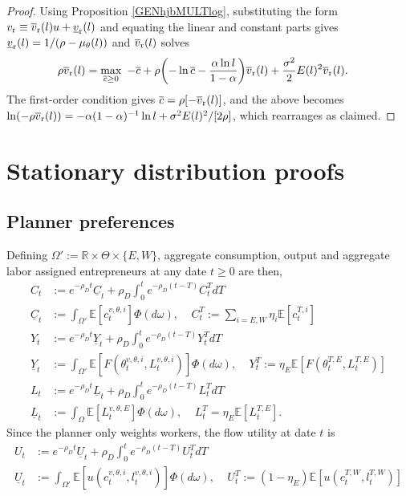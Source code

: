 \documentclass[11pt]{article}
\theoremstyle{plain}
\begin{document}
\begin{proof}
Using Proposition \ref{GENhjbMULTlog}, substituting the form $v_{\textnormal{r}} \equiv \overline{v}_{\textnormal{r}}(l)u + \underline{v}_{\textnormal{r}}(l)$ and equating the linear and constant parts gives $\underline{v}_{\textnormal{r}}(l) = 1/(\rho - \mu_{\theta}(l))$ and $\overline{v}_{\textnormal{r}}(l)$ solves
\begin{align*}
\rho \overline{v}_{\textnormal{r}}(l) & = \max_{\substack{\overline{c} \geq 0}} \ - \overline{c} + \rho {\left(-\ln \overline{c} - \frac{\alpha \ln l}{1-\alpha}\right)}\overline{v}_{\textnormal{r}}(l) + \frac{\sigma^2}{2}E(l)^2\overline{v}_{\textnormal{r}}(l).
\end{align*}
The first-order condition gives $\overline{c} = \rho[-\overline{v}_{\textnormal{r}}(l)]$, and the above becomes $\ln (-\rho\overline{v}_{\textnormal{r}}(l)) = - \alpha(1-\alpha)^{-1} \ln l + \sigma^2E(l)^2/[2\rho]$, which rearranges as claimed.
\end{proof}


\section{Stationary distribution proofs} \label{distproofs}
\subsection{Planner preferences} \label{planPREFapp}

Defining $\Omega' := \mathbb{R} \times \Theta \times \{E,W\}$, aggregate consumption, output and aggregate labor assigned  entrepreneurs at any date $t\geq0$ are then,
\begin{align*}
C_t & := e^{-\rho_Dt}\underline{C}_t + \rho_D\int_{0}^{t}e^{-\rho_D (t-T)} C^T_tdT
\\ \underline{C}_t  & := \int_{\Omega'}\mathbb{E}[c^{v,\theta,i}_t]\Phi(d\omega), \ \ \ \ \ C^T_t := \sum_{i=E,W}\eta_i \mathbb{E}[c^{T,i}_t]
\\ Y_t & := e^{-\rho_Dt}\underline{Y}_t + \rho_D\int_0^te^{-\rho_D (t-T)} Y^T_tdT
\\ \underline{Y}_t & := \int_{\Omega'}\mathbb{E}[F(\theta^{v,\theta,i}_t,L^{v,\theta,i}_{t})]\Phi(d\omega), \ \ \ \ \ Y^T_t := \eta_E\mathbb{E}[F(\theta^{T,E}_t,L^{T,E}_t)]
\\ L_t & := e^{-\rho_Dt}\underline{L}_t + \rho_D\int_{0}^{t}e^{-\rho_D(t-T)}L^T_tdT
\\ \underline{L}_t & := \int_{\Omega}\mathbb{E} [L^{v,\theta,E}_{t}]\Phi(d\omega), \ \ \ \ \ L^T_t = \eta_E\mathbb{E}[L^{T,E}_t].
\end{align*}
Since the planner only weights workers, the flow utility at date $t$ is 
\begin{align*}
U_t & := e^{- \rho_D t}\underline{U}_t + \rho_D\int_{0}^{t}e^{-\rho_D(t-T)} U^T_tdT
\\ \underline{U}_t & := \int_{\Omega'} \mathbb{E}[u(c^{v,\theta,i}_t,l^{v,\theta,i}_t)]\Phi(d\omega), \ \ \ \ \ U^T_t := (1-\eta_E)\mathbb{E}[u(c^{T,W}_t,l^{T,W}_t)]
\end{align*} 
\end{document}
